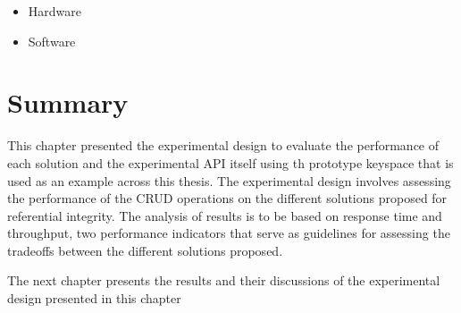 \begin{itemize}
  \item Hardware
  \item Software
\end{itemize}










\section{Summary} \label{sexp:Summary} 

This chapter  presented the experimental design to evaluate the performance of
each  solution and the experimental \ac{API} itself using th prototype keyspace
that is used as an example across this thesis. The experimental design involves
assessing the performance of the CRUD operations on the different solutions
proposed for referential integrity.
The analysis of results is to be based on response time and throughput, two
performance indicators that serve as guidelines for assessing the tradeoffs
between the different solutions proposed.
	
	
The next chapter presents the results and their discussions of the experimental
design presented in this chapter
 






